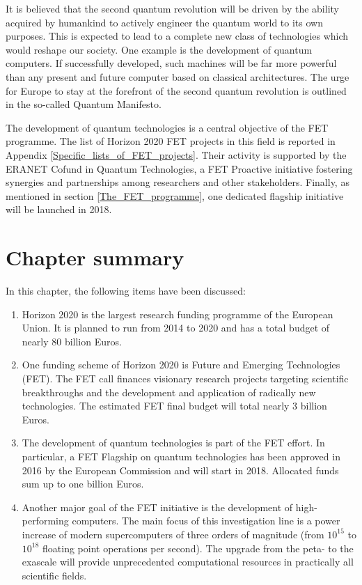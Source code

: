It is believed that the second quantum revolution will be driven by the ability acquired by humankind to actively engineer the quantum world to its own purposes. This is expected to lead to a complete new class of technologies which would reshape our society. One example is the development of quantum computers. If successfully developed, such machines will be far more powerful than any present and future computer based on classical architectures. The urge for Europe to stay at the forefront of the second quantum revolution is outlined in the so-called Quantum Manifesto.


The development of quantum technologies is a central objective of the FET programme.  The list of Horizon 2020 FET projects in this field is reported in Appendix \ref{Specific_lists_of_FET_projects}. Their activity is supported by the ERANET Cofund in Quantum Technologies, a FET Proactive initiative fostering synergies and partnerships among researchers and other stakeholders. Finally, as mentioned in section \ref{The_FET_programme}, one dedicated flagship initiative will be launched in 2018. 

\section{Chapter summary} 
In this chapter, the following items have been discussed:

\begin{enumerate}
 \item Horizon 2020 is the largest research funding programme of the European Union. It is planned to run from 2014 to 2020 and has a total budget of nearly 80 billion Euros. 
 \item One funding scheme of Horizon 2020 is Future and Emerging Technologies (FET). The FET call finances visionary research projects targeting scientific breakthroughs and the development and application of radically new technologies. The estimated FET final budget will total nearly 3 billion Euros. 
 \item The development of quantum technologies is part of the FET effort. In particular, a FET Flagship on quantum technologies has been approved in 2016 by the European Commission and will start in 2018. Allocated funds sum up to one billion Euros. 
 \item Another major goal of the FET initiative is the development of high-performing computers. The main focus of this investigation line is a power increase of modern supercomputers of three orders of magnitude (from $10^{15}$ to $10^{18}$ floating point operations per second). The upgrade from the peta- to the exascale will provide unprecedented computational resources in practically all scientific fields.    
\end{enumerate}